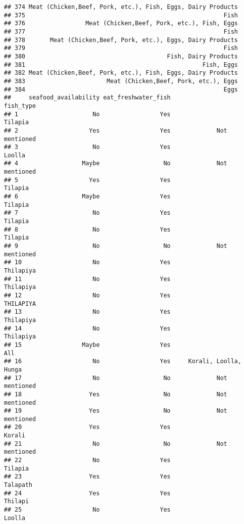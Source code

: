 \documentclass[
]{article}
\begin{document}
\begin{verbatim}
## 374 Meat (Chicken,Beef, Pork, etc.), Fish, Eggs, Dairy Products
## 375                                                        Fish
## 376                 Meat (Chicken,Beef, Pork, etc.), Fish, Eggs
## 377                                                        Fish
## 378       Meat (Chicken,Beef, Pork, etc.), Eggs, Dairy Products
## 379                                                        Fish
## 380                                        Fish, Dairy Products
## 381                                                  Fish, Eggs
## 382 Meat (Chicken,Beef, Pork, etc.), Fish, Eggs, Dairy Products
## 383                       Meat (Chicken,Beef, Pork, etc.), Eggs
## 384                                                        Eggs
##     seafood_availability eat_freshwater_fish                 fish_type
## 1                     No                 Yes                   Tilapia
## 2                    Yes                 Yes             Not mentioned
## 3                     No                 Yes                    Loolla
## 4                  Maybe                  No             Not mentioned
## 5                    Yes                 Yes                  Tilapia 
## 6                  Maybe                 Yes                  Tilapia 
## 7                     No                 Yes                  Tilapia 
## 8                     No                 Yes                  Tilapia 
## 9                     No                  No             Not mentioned
## 10                    No                 Yes                 Thilapiya
## 11                    No                 Yes                 Thilapiya
## 12                    No                 Yes                 THILAPIYA
## 13                    No                 Yes                 Thilapiya
## 14                    No                 Yes                 Thilapiya
## 15                 Maybe                 Yes                       All
## 16                    No                 Yes     Korali, Loolla, Hunga
## 17                    No                  No             Not mentioned
## 18                   Yes                  No             Not mentioned
## 19                   Yes                  No             Not mentioned
## 20                   Yes                 Yes                    Korali
## 21                    No                  No             Not mentioned
## 22                    No                 Yes                  Tilapia 
## 23                   Yes                 Yes                  Talapath
## 24                   Yes                 Yes                   Thilapi
## 25                    No                 Yes                    Loolla

\end{verbatim}
\end{document}
